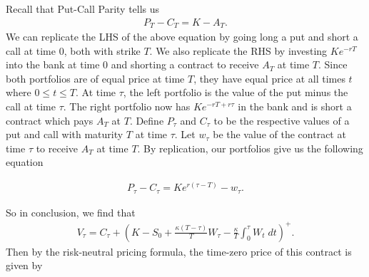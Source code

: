 \documentclass[reqno]{amsart}
\begin{document}
Recall that Put-Call Parity tells us
\begin{align}
     P_T - C_T = K - A_T. 
\end{align}
We can replicate the LHS of the above equation by going long a put and short a call at time $0$, both with strike $T$. 
We also replicate the RHS by investing $Ke^{-rT}$ into the bank at time 0 and shorting a contract to receive $A_T$ at time $T$. 
Since both portfolios are of equal price at time $T$, they have equal price at all times $t$ where $0 \leq t \leq T$. 
At time $\tau$, the left portfolio is the value of the put minus the call at time $\tau$. 
The right portfolio now has $Ke^{-rT + r\tau}$ in the bank and is short a contract which pays $A_T$ at $T$.
Define $P_\tau$ and $C_\tau$ to be the respective values of a put and call with maturity $T$ at time $\tau$.
Let $w_\tau$ be the value of the contract at time $\tau$ to receive $A_T$ at time $T$.
By replication, our portfolios give us the following equation

\begin{align}
     P_\tau - C_\tau = Ke^{r(\tau - T)} - w_\tau.
\end{align}

So in conclusion, we find that 
\begin{align}
     V_\tau = C_\tau + \left(K- S_0 + \frac{\kappa(T-\tau)}{T} W_\tau - \frac{\kappa}{T} \int_0^\tau W_t \; dt  \right)^+.
\end{align}
Then by the risk-neutral pricing formula, the time-zero price of this contract is given by 
\end{document}
